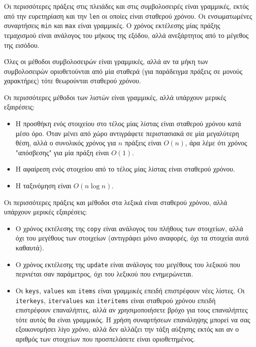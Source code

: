 \documentclass[10pt]{book}
\begin{document}
Οι περισσότερες πράξεις στις πλειάδες και στις συμβολοσειρές είναι γραμμικές, εκτός 
από την ευρετηρίαση και την {\tt len} οι οποίες είναι σταθερού χρόνου.  Οι ενσωματωμένες συναρτήσεις
{\tt min} και {\tt max} είναι γραμμικές.  Ο χρόνος εκτέλεσης μίας πράξης τεμαχισμού είναι ανάλογος
του μήκους της εξόδου, αλλά ανεξάρτητος από το μέγεθος της εισόδου.

Όλες οι μέθοδοι συμβολοσειρών είναι γραμμικές, αλλά αν τα μήκη των συμβολοσειρών οριοθετούνται από μία
σταθερά (για παράδειγμα πράξεις σε μονούς χαρακτήρες) τότε θεωρούνται σταθερού χρόνου.

Οι περισσότερες μέθοδοι των λιστών είναι γραμμικές, αλλά υπάρχουν μερικές εξαιρέσεις: 

\begin{itemize}

\item Η προσθήκη ενός στοιχείου στο τέλος μίας λίστας είναι σταθερού χρόνου κατά μέσο όρο. Όταν μένει
από χώρο αντιγράφετε περιστασιακά σε μία μεγαλύτερη θέση, αλλά ο συνολικός χρόνος για $n$ πράξεις είναι
$O(n)$, άρα λέμε ότι χρόνος "απόσβεσης" για μία πράξη είναι $O(1)$.

\item Η αφαίρεση ενός στοιχείου από το τέλος μίας λίστας είναι σταθερού χρόνου.

\item Η ταξινόμηση είναι $O(n \log n)$.

\end{itemize}

Οι περισσότερες πράξεις και μέθοδοι στα λεξικά είναι σταθερού χρόνου, αλλά υπάρχουν μερικές εξαιρέσεις:

 
\begin{itemize}

\item Ο χρόνος εκτέλεσης της {\tt copy} είναι ανάλογος του πλήθους των 
  στοιχείων, αλλά όχι του μεγέθους των στοιχείων (αντιγράφει μόνο αναφορές, όχι 
  τα στοιχεία αυτά καθαυτά).

\item Ο χρόνος εκτέλεσης της {\tt update} είναι ανάλογος του μεγέθους του 
  λεξικού που περνιέται σαν παράμετρος, όχι του λεξικού που ενημερώνεται.

\item Οι {\tt keys}, {\tt values} και {\tt items} είναι γραμμικές 
  επειδή επιστρέφουν νέες λίστες.  Οι {\tt iterkeys}, {\tt itervalues} και 
  {\tt iteritems} είναι σταθερού χρόνου επειδή επιστρέφουν επαναλήπτες,
  αλλά αν χρησιμοποιήσετε βρόχο για τους επαναλήπτες τότε αυτός θα είναι γραμμικός. 
  Η χρήση συναρτήσεων επανάληψης μπορεί να σας εξοικονομήσει λίγο χρόνο, αλλά δεν 
  αλλάζει την τάξη αύξησης εκτός και αν ο αριθμός των στοιχείων που προσπελάσετε 
  είναι οριοθετημένος.

\end{itemize}
\end{document}
